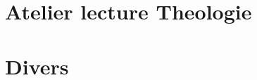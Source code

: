 \documentclass[oneside,10pt]{book}
\begin{document}
 
 
  \part{Atelier lecture Theologie}
 
 
  
  
    
  
 

 
 
 \part{Divers}




 


%

\printbibliography

%
\end{document}

